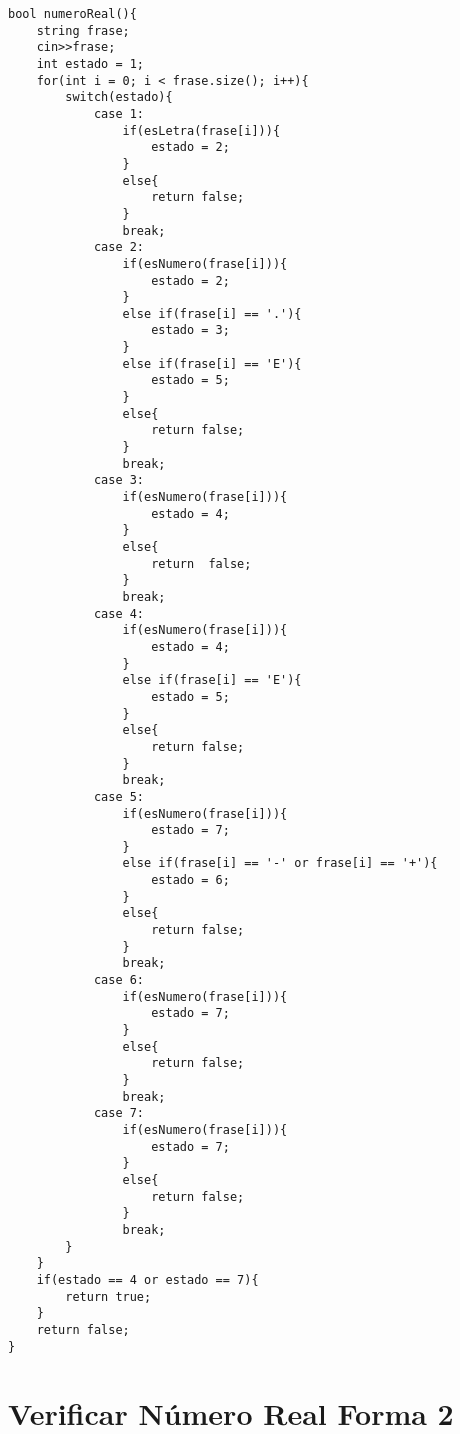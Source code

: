 \documentclass[a4paper,12pt]{article}
\begin{document}
\begin{lstlisting}
bool numeroReal(){
    string frase;
    cin>>frase;
    int estado = 1;
    for(int i = 0; i < frase.size(); i++){
        switch(estado){
            case 1:
                if(esLetra(frase[i])){
                    estado = 2;
                }
                else{
                    return false;
                }
                break;
            case 2:
                if(esNumero(frase[i])){
                    estado = 2;
                }
                else if(frase[i] == '.'){
                    estado = 3;
                }
                else if(frase[i] == 'E'){
                    estado = 5;
                }
                else{
                    return false;
                }
                break;
            case 3:
                if(esNumero(frase[i])){
                    estado = 4;
                }
                else{
                    return  false;
                }
                break;
            case 4:
                if(esNumero(frase[i])){
                    estado = 4;
                }
                else if(frase[i] == 'E'){
                    estado = 5;
                }
                else{
                    return false;
                }
                break;
            case 5:
                if(esNumero(frase[i])){
                    estado = 7;
                }
                else if(frase[i] == '-' or frase[i] == '+'){
                    estado = 6;
                }
                else{
                    return false;
                }
                break;
            case 6:
                if(esNumero(frase[i])){
                    estado = 7;
                }
                else{
                    return false;
                }
                break;
            case 7:
                if(esNumero(frase[i])){
                    estado = 7;
                }
                else{
                    return false;
                }
                break;
        }
    }
    if(estado == 4 or estado == 7){
        return true;
    }
    return false;
}
\end{lstlisting}

\section{Verificar Número Real Forma 2}
\end{document}
